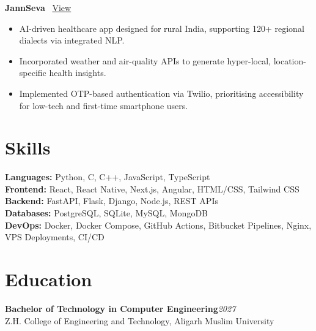 \documentclass[10pt,letterpaper]{article}
\begin{document}
\textbf{JannSeva} \ \href{https://github.com/Saadat-Ahmad/JannSeva}{\small View}
\begin{itemize}
  \item AI-driven healthcare app designed for rural India, supporting 120+ regional dialects via integrated NLP.
  \item Incorporated weather and air-quality APIs to generate hyper-local, location-specific health insights.
  \item Implemented OTP-based authentication via Twilio, prioritising accessibility for low-tech and first-time smartphone users.
\end{itemize}

\section*{Skills}
\textbf{Languages:} Python, C, C++, JavaScript, TypeScript\\
\textbf{Frontend:} React, React Native, Next.js, Angular, HTML/CSS, Tailwind CSS\\
\textbf{Backend:} FastAPI, Flask, Django, Node.js, REST APIs\\
\textbf{Databases:} PostgreSQL, SQLite, MySQL, MongoDB\\
\textbf{DevOps:} Docker, Docker Compose, GitHub Actions, Bitbucket Pipelines, Nginx, VPS Deployments, CI/CD

\section*{Education}
\textbf{Bachelor of Technology in Computer Engineering}\hfill\textit{2027}\\
Z.H. College of Engineering and Technology, Aligarh Muslim University
\end{document}
